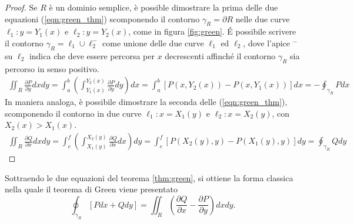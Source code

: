 \begin{proof}
Se $R$ è un dominio semplice, è possible dimostrare la prima delle due equazioni (\ref{eqn:green_thm}) scomponendo il contorno $\gamma_R = \partial R$ nelle due curve $\ell_1: y=Y_1(x)$ e $\ell_2: y=Y_2(x)$, come in figura \ref{fig:green}. \'E possibile scrivere il contorno $\gamma_R = \ell_1 \cup \ell^{-}_2$ come unione delle due curve $\ell_1$ ed $\ell_2$, dove l'apice $^{-}$ su $\ell_2$ indica che deve essere percorsa per $x$ decrescenti affinché il contorno $\gamma_R$ sia percorso in senso positivo.
%
%
\begin{equation}
\begin{aligned}
  \iint _R \frac{\partial P}{\partial y} dx dy = 
  \int_{a}^{b} \displaystyle \left(\int_{Y_1(x)}^{Y_2(x)} \frac{\partial P}{\partial y} dy \right) dx = 
 \int_{a}^{b} \left[ P(x,Y_2(x)) - P(x,Y_1(x)) \right] dx = - \oint_{\gamma_R} P dx
\end{aligned}
\end{equation}
%
In maniera analoga, è possibile dimostrare la seconda delle (\ref{eqn:green_thm}), scomponendo il contorno in due curve $\ell_1: x=X_1(y)$ e $\ell_2: x=X_2(y)$, con $X_2(x) > X_1(x)$.
%
\begin{equation}
\begin{aligned}
  \iint _R \frac{\partial Q}{\partial x} dx dy = 
  \int_{e}^{f} \displaystyle \left(\int_{X_1(y)}^{X_2(y)} \frac{\partial Q}{\partial x} dx \right) dy = 
 \int_{e}^{f} \left[ P(X_2(y),y) - P(X_1(y),y) \right] dy = \oint_{\gamma_R} Q dy
\end{aligned}
\end{equation}
%
\end{proof}
%
%
Sottraendo le due equazioni del teorema \ref{thm:green}, si ottiene la forma classica nella quale il teorema di Green viene presentato
\begin{equation}
   \oint_{\gamma_R} [P dx + Q dy] = 
  \iint_R \displaystyle\left( \frac{\partial Q}{\partial x} - \frac{\partial P}{\partial y} \right) dx dy .
\end{equation}
%


